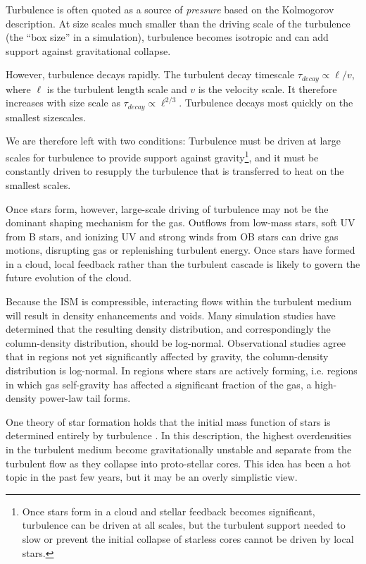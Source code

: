 Turbulence is often quoted as a source of \emph{pressure} based on the
Kolmogorov description.  At size scales much smaller than the driving scale of
the turbulence (the ``box size'' in a simulation), turbulence becomes isotropic
and can add support against gravitational collapse.  

However, turbulence decays rapidly.  The turbulent decay timescale
$\tau_{decay}\propto \ell / v$, where $\ell$ is the turbulent length scale and $v$ is
the velocity scale.  It therefore increases with size scale as
$\tau_{decay}\propto \ell^{2/3}$.  Turbulence decays most quickly on the smallest
sizescales.

We are therefore left with two conditions: Turbulence must be driven at large
scales for turbulence to provide support against gravity\footnote{Once stars form
in a cloud and stellar feedback becomes significant, turbulence can be driven at all
scales, but the turbulent support needed to slow or prevent the initial
collapse of starless cores cannot be driven by local stars.}, and it must be
constantly driven to resupply the turbulence that is transferred to heat on the
smallest scales.

Once stars form, however, large-scale driving of turbulence may not be the
dominant shaping mechanism for the gas.  Outflows from low-mass stars, soft UV
from B stars, and ionizing UV and strong winds from OB stars can drive gas
motions, disrupting gas or replenishing turbulent energy.  Once stars have
formed in a cloud, local feedback rather than the turbulent cascade is likely
to govern the future evolution of the cloud.

Because the ISM is compressible, interacting flows within the turbulent medium
will result in density enhancements and voids.  Many simulation studies have
determined that the resulting density distribution, and correspondingly the
column-density distribution, should be log-normal.  Observational
studies agree that in regions not yet significantly affected by gravity, the 
column-density distribution is log-normal.  In regions where stars are actively
forming, i.e. regions in which gas self-gravity has affected a significant fraction
of the gas, a high-density power-law tail forms.

One theory of star formation holds that the initial mass function of stars is
determined entirely by turbulence \citep{Padoan2002,Padoan2007,Krumholz2005c}.  In this
description, the highest overdensities in the turbulent medium become
gravitationally unstable and separate from the turbulent flow as they collapse
into proto-stellar cores.  This idea has been a hot topic in the past few
years, but it may be an overly simplistic view.

